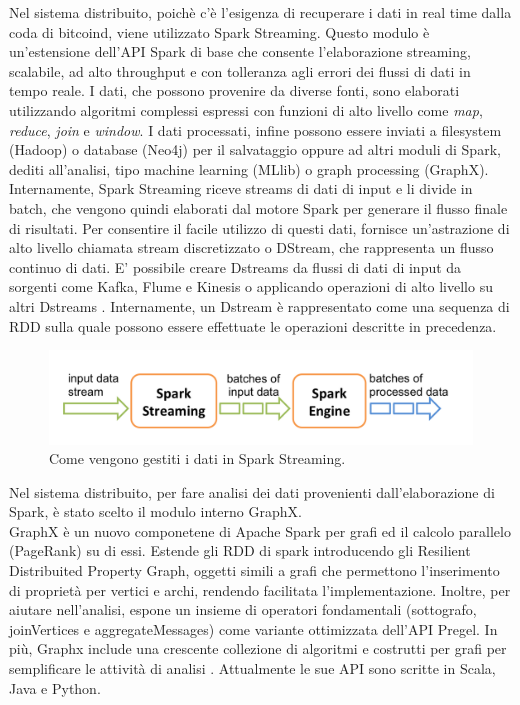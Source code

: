 Nel sistema distribuito, poichè c'è l'esigenza di recuperare i dati in real time dalla coda di bitcoind, viene utilizzato Spark Streaming. Questo modulo è un'estensione dell'API Spark di base che consente l'elaborazione streaming, scalabile, ad alto throughput e con tolleranza agli errori dei flussi di dati in tempo reale. I dati, che possono provenire da diverse fonti, sono elaborati utilizzando algoritmi complessi espressi con funzioni di alto livello come \textit{map}, \textit{reduce}, \textit{join} e \textit{window}. I dati processati, infine possono essere inviati a filesystem (Hadoop) o database (Neo4j) per il salvataggio oppure ad altri moduli di Spark, dediti all'analisi, tipo machine learning (MLlib) o graph processing (GraphX). 
\\Internamente, Spark Streaming riceve streams di dati di input e li divide in batch, che vengono quindi elaborati dal motore Spark per generare il flusso finale di risultati. Per consentire il facile utilizzo di questi dati, fornisce un'astrazione di alto livello chiamata stream discretizzato o DStream, che rappresenta un flusso continuo di dati. E' possibile creare Dstreams da flussi di dati di input da sorgenti come Kafka, Flume e Kinesis o applicando operazioni di alto livello su altri Dstreams \cite{spark:home-streaming}. Internamente, un Dstream è rappresentato come una sequenza di RDD sulla quale possono essere effettuate le operazioni descritte in precedenza.
\begin{figure}[H]
	\centering
	\includegraphics[width=\textwidth]{images/streamingSpark.png}
	\caption{Come vengono gestiti i dati in Spark Streaming.}
	\label{fig:streamingSpark}
\end{figure}
Nel sistema distribuito, per fare analisi dei dati provenienti dall'elaborazione di Spark, è stato scelto il modulo interno GraphX.
\\GraphX è un nuovo componetene di Apache Spark per grafi ed il calcolo parallelo (PageRank) su di essi. Estende gli RDD di spark introducendo gli Resilient Distribuited Property Graph, oggetti simili a grafi che permettono l'inserimento di proprietà per vertici e archi, rendendo facilitata l'implementazione. Inoltre, per aiutare nell'analisi, espone un insieme di operatori fondamentali (sottografo, joinVertices e aggregateMessages) come variante ottimizzata dell'API Pregel. In più, Graphx include una crescente collezione di algoritmi e costrutti per grafi per semplificare le attività di analisi \cite{spark:graphx}. Attualmente le sue API sono scritte in Scala, Java e Python.
